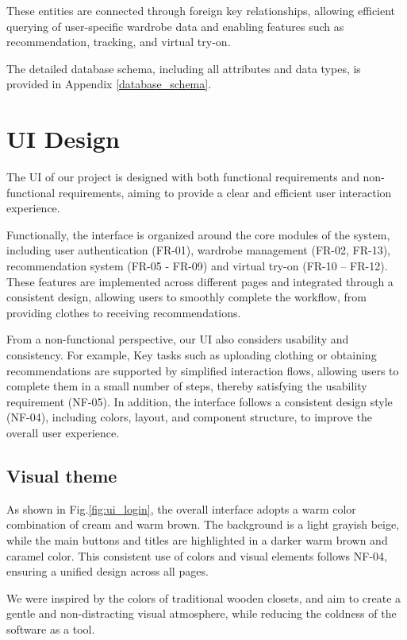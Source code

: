 These entities are connected through foreign key relationships, allowing efficient querying of user-specific wardrobe data and enabling features such as recommendation, tracking, and virtual try-on.

The detailed database schema, including all attributes and data types, is provided in Appendix \ref{database_schema}.



\section{UI Design}
\label{chapter_ui_design}
The UI of our project is designed with both functional requirements and non-functional requirements, aiming to provide a clear and efficient user interaction experience.

Functionally, the interface is organized around the core modules of the system, including user authentication (FR-01), wardrobe management (FR-02, FR-13), recommendation system (FR-05 - FR-09) and virtual try-on (FR-10 – FR-12). These features are implemented across different pages and integrated through a consistent design, allowing users to smoothly complete the workflow, from providing clothes to receiving recommendations.

From a non-functional perspective, our UI also considers usability and consistency. For example, Key tasks such as uploading clothing or obtaining recommendations are supported by simplified interaction flows, allowing users to complete them in a small number of steps, thereby satisfying the usability requirement (NF-05). In addition, the interface follows a consistent design style (NF-04), including colors, layout, and component structure, to improve the overall user experience. 


\subsection{Visual theme}
As shown in Fig.\ref{fig:ui_login}, the overall interface adopts a warm color combination of cream and warm brown. The background is a light grayish beige, while the main buttons and titles are highlighted in a darker warm brown and caramel color. This consistent use of colors and visual elements follows NF-04, ensuring a unified design across all pages.

We were inspired by the colors of traditional wooden closets, and aim to create a gentle and non-distracting visual atmosphere, while reducing the coldness of the software as a tool.


